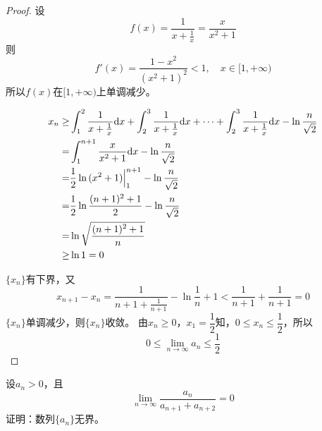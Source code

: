 \begin{proof}

    设
    \[f(x) = \dfrac{1}{x + \frac{1}{x}} = \dfrac{x}{x^2 + 1}\]
    则
    \[f'(x) = \dfrac{1 - x^2}{(x^2 + 1)^2} < 1, \quad x \in [1, +\infty)\]
    所以$f(x)$在$[1, +\infty)$上单调减少。

    \begin{align*}
        x_n \geq & \int_{1}^{2}{\dfrac{1}{x + \frac{1}{x}}}\mathrm{d} x + \int_{2}^{3}{\dfrac{1}{x + \frac{1}{x}}}\mathrm{d} x + \cdots + \int_{2}^{3}{\dfrac{1}{x + \frac{1}{x}}}\mathrm{d} x - \ln{\dfrac{n}{\sqrt{2}}} \\
        = & \int_{1}^{n + 1}{\dfrac{x}{x^2 + 1}}\mathrm{d} x - \ln{\dfrac{n}{\sqrt{2}}} \\
        = & \dfrac{1}{2} \ln{(x^2 + 1)} \Big|_{1}^{n + 1} - \ln{\dfrac{n}{\sqrt{2}}} \\
        = & \dfrac{1}{2} \ln{\dfrac{(n + 1)^2 + 1}{2}} - \ln{\dfrac{n}{\sqrt{2}}} \\
        = & \ln{\sqrt{\dfrac{(n + 1)^2 + 1}{n}}} \\
        \geq & \ln1 = 0 
    \end{align*}

    $\{x_n\}$有下界，又
    \[x_{n + 1} - x_n = \dfrac{1}{n + 1 + \frac{1}{n + 1}} - \ln{\dfrac{1}{n} + 1} < \dfrac{1}{n + 1} + \dfrac{1}{n + 1} = 0\]
    $\{x_n\}$单调减少，则$\{x_n\}$收敛。
    由$x_n \geq 0$，$x_1 = \dfrac{1}{2} $知，$0 \leq x_n \leq \dfrac{1}{2}$，所以
    \[0 \leq \lim\limits_{n \to \infty}{a_n} \leq \dfrac{1}{2}\]

\end{proof}

\begin{proposition}

    设$a_n > 0$，且
    \[\lim\limits_{n \to \infty}{\dfrac{a_n}{a_{n + 1} + a_{n + 2}}} = 0\]
    证明：数列$\{a_n\}$无界。
    
\end{proposition}

